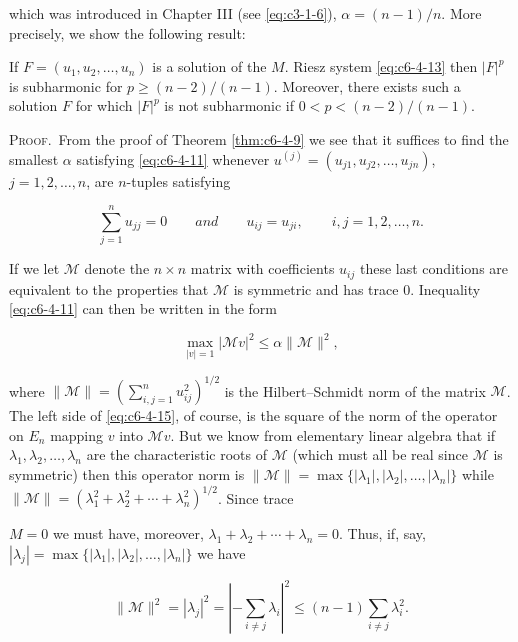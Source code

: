 which was introduced in Chapter III (see \eqref{eq:c3-1-6}), $\alpha = (n - 1)/n$. More precisely, we show the following result:

\begin{theorem}
\label{thm:c6-4-14}
If $F = (u_1, u_2, \ldots, u_n)$ is a solution of the $M$. Riesz system \eqref{eq:c6-4-13} then $|F|^p$ is subharmonic for $p \geq (n-2)/(n-1)$. Moreover, there exists such a solution $F$ for which $|F|^p$ is not subharmonic if $0 < p < (n-2)/(n-1)$.
\end{theorem}

\textsc{Proof.}\ From the proof of Theorem \ref{thm:c6-4-9} we see that it suffices to find the smallest $\alpha$ satisfying \eqref{eq:c6-4-11} whenever $u^{(j)} = (u_{j1}, u_{j2}, \ldots, u_{jn})$, $j = 1, 2, \ldots, n$, are $n$-tuples satisfying

\[
\sum_{j=1}^{n}u_{jj}=0\qquad and\qquad u_{ij}=u_{ji},\qquad i,j=1,2,\ldots,n.
\]

If we let $\mathcal{M}$ denote the $n \times n$ matrix with coefficients $u_{ij}$ these last conditions are equivalent to the properties that $\mathcal{M}$ is symmetric and has trace 0. Inequality \eqref{eq:c6-4-11} can then be written in the form

\begin{equation}\label{eq:c6-4-15}
\max_{|v|=1}|{\mathcal M}v|^{2}\le\alpha\|\mathcal M\|^{2},
\end{equation}

where $\|\mathcal{M}\| = (\sum_{i,j=1}^{n} u_{ij}^{2})^{1/2}$ is the Hilbert--Schmidt norm of the matrix $\mathcal{M}$. The left side of \eqref{eq:c6-4-15}, of course, is the square of the norm of the operator on $E_n$ mapping $v$ into $\mathcal{M}v$. But we know from elementary linear algebra that if $\lambda_1, \lambda_2, \ldots, \lambda_n$ are the characteristic roots of $\mathcal{M}$ (which must all be real since $\mathcal{M}$ is symmetric) then this operator norm is $\|\mathcal{M}\| = \max\{|\lambda_1|, |\lambda_2|, \ldots, |\lambda_n|\}$ while $\|\mathcal{M}\| = (\lambda_1^2 + \lambda_2^2 + \cdots + \lambda_n^2)^{1/2}$. Since trace

$M = 0$ we must have, moreover, $\lambda_1 + \lambda_2 + \cdots + \lambda_n = 0$. Thus, if, say, $|\lambda_j| = \max\{|\lambda_1|, |\lambda_2|, \ldots, |\lambda_n|\}$ we have

\[
\|\mathcal{M}\|^{2}=|\lambda_{j}|^{2}=|-\sum_{i\neq j}\lambda_{i}|^{2}\leq(n-1)\sum_{i\neq j}\lambda_{i}^{2}.
\]

